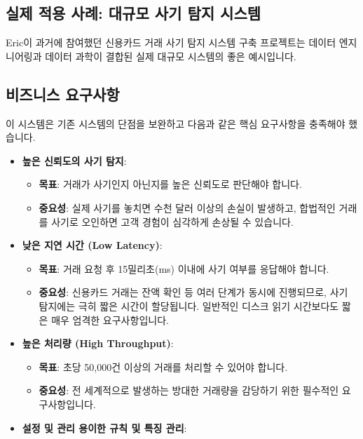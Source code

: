 \documentclass[11pt,a4paper]{article}
\begin{document}
\begin{itemize}
\begin{itemize}
\begin{itemize}
\begin{itemize}
\newpage
\section*{실제 적용 사례: 대규모 사기 탐지 시스템}

Eric이 과거에 참여했던 신용카드 거래 사기 탐지 시스템 구축 프로젝트는 데이터 엔지니어링과 데이터 과학이 결합된 실제 대규모 시스템의 좋은 예시입니다.

\subsection*{비즈니스 요구사항}

이 시스템은 기존 시스템의 단점을 보완하고 다음과 같은 핵심 요구사항을 충족해야 했습니다.

\begin{itemize}
    \item \textbf{높은 신뢰도의 사기 탐지}:
    \begin{itemize}
        \item \textbf{목표}: 거래가 사기인지 아닌지를 높은 신뢰도로 판단해야 합니다.
        \item \textbf{중요성}: 실제 사기를 놓치면 수천 달러 이상의 손실이 발생하고, 합법적인 거래를 사기로 오인하면 고객 경험이 심각하게 손상될 수 있습니다.
    \end{itemize}
    \item \textbf{낮은 지연 시간 (Low Latency)}:
    \begin{itemize}
        \item \textbf{목표}: 거래 요청 후 15밀리초(ms) 이내에 사기 여부를 응답해야 합니다.
        \item \textbf{중요성}: 신용카드 거래는 잔액 확인 등 여러 단계가 동시에 진행되므로, 사기 탐지에는 극히 짧은 시간이 할당됩니다. 일반적인 디스크 읽기 시간보다도 짧은 매우 엄격한 요구사항입니다.
    \end{itemize}
    \item \textbf{높은 처리량 (High Throughput)}:
    \begin{itemize}
        \item \textbf{목표}: 초당 50,000건 이상의 거래를 처리할 수 있어야 합니다.
        \item \textbf{중요성}: 전 세계적으로 발생하는 방대한 거래량을 감당하기 위한 필수적인 요구사항입니다.
    \end{itemize}
    \item \textbf{설정 및 관리 용이한 규칙 및 특징 관리}:
    \begin{itemize}

\end{itemize}
\end{itemize}
\end{itemize}
\end{itemize}
\end{itemize}
\end{itemize}
\end{document}
